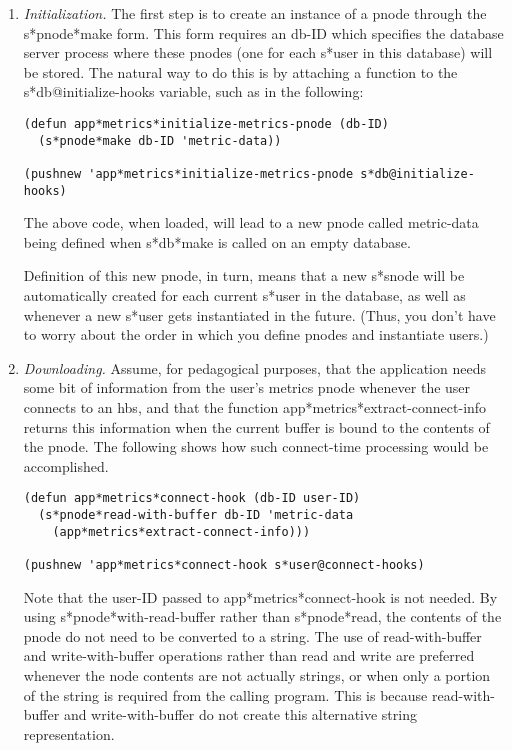 \begin{enumerate}
\item {\em Initialization.} The first step is to create an instance of a
  pnode through the s*pnode*make form.  This form requires an db-ID which
  specifies the database server process where these pnodes (one for each
  s*user in this database) will be stored.  The natural way to do this is
  by attaching a function to the s*db@initialize-hooks variable, such
  as in the following:

  \small\begin{verbatim}
(defun app*metrics*initialize-metrics-pnode (db-ID)
  (s*pnode*make db-ID 'metric-data))

(pushnew 'app*metrics*initialize-metrics-pnode s*db@initialize-hooks)
  \end{verbatim}\normalsize
    
  The above code, when loaded, will lead to a new pnode called
  metric-data being defined when s*db*make is called on an empty database.
  
  Definition of this new pnode, in turn, means that a new s*snode will be
  automatically created for each current s*user in the database, as well as
  whenever a new s*user gets instantiated in the future. (Thus, you don't
  have to worry about the order in which you define pnodes and instantiate
  users.)
  
\item {\em Downloading.} Assume, for pedagogical purposes, that the
  application needs some bit of information from the user's metrics pnode
  whenever the user connects to an hbs, and that the function
  app*metrics*extract-connect-info returns this information when the
  current buffer is bound to the contents of the pnode.  The following
  shows how such connect-time processing would be accomplished.

  \small\begin{verbatim}
(defun app*metrics*connect-hook (db-ID user-ID)
  (s*pnode*read-with-buffer db-ID 'metric-data 
    (app*metrics*extract-connect-info)))

(pushnew 'app*metrics*connect-hook s*user@connect-hooks)
  \end{verbatim}\normalsize
  
  Note that the user-ID passed to app*metrics*connect-hook is not needed.
  By using s*pnode*with-read-buffer rather than s*pnode*read, the
  contents of the pnode do not need to be converted to a string.  The use
  of read-with-buffer and write-with-buffer operations rather than read
  and write are preferred whenever the node contents are not actually
  strings, or when only a portion of the string is required from the
  calling program.  This is because read-with-buffer and
  write-with-buffer do not create this alternative string representation.


\end{enumerate}
